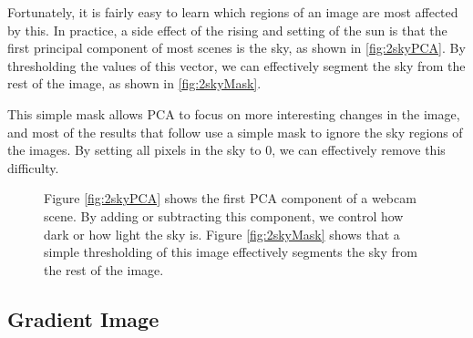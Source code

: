 Fortunately, it is fairly easy to learn which regions of an image are most affected by this.  In practice, a side effect of the rising and setting of the sun is that the first principal component of most scenes is the sky, as shown in \ref{fig:2skyPCA}.  By thresholding the values of this vector, we can effectively segment the sky from the rest of the image, as shown in \ref{fig:2skyMask}.

This simple mask allows PCA to focus on more interesting changes in the image, and most of the results that follow use a simple mask to ignore the sky regions of the images.  By setting all pixels in the sky to 0, we can effectively remove this difficulty.


\begin{figure}
	\centering
		\caption[Learning a sky mask for a webcam scene.]{Figure \ref{fig:2skyPCA} shows the first PCA component of a webcam scene.  By adding or subtracting this component, we control how dark or how light the sky is. Figure \ref{fig:2skyMask} shows that a simple thresholding of this image effectively segments the sky from the rest of the image.}
		
\end{figure}\subsection{Gradient Image}

